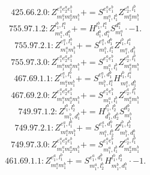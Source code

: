 \documentclass[letterpaper,10pt,fleqn,leqno,onecolumn]{article}
\begin{document}
\begin{equation} \;\;\;\;\;\;  425.66.2.0: Z^{e_{1}^{a}e_{2}^{a}e_{1}^{b}}_{m_{1}^{a}m_{2}^{a}m_{1}^{b}}+=S^{e_{1}^{a}e_{1}^{b}}_{m_{1}^{a},l_{1}^{b}}Z^{e_{2}^{a},l_{1}^{b}}_{m_{2}^{a}m_{1}^{b}} \end{equation}
\begin{equation} \;\;\;\;\;\;  755.97.1.2: Z^{l_{1}^{b},l_{1}^{a}}_{m_{1}^{a},d_{1}^{b}}+=H^{l_{1}^{b},l_{1}^{a}}_{d_{1}^{b},d_{1}^{a}}S^{d_{1}^{a}}_{m_{1}^{a}}\cdot -1. \end{equation}
\begin{equation} \;\;\;\;\;\;  755.97.2.1: Z^{e_{1}^{a},l_{1}^{b}}_{m_{1}^{a}m_{1}^{b}}+=S^{e_{1}^{a},d_{1}^{b}}_{m_{1}^{b},l_{1}^{a}}Z^{l_{1}^{b},l_{1}^{a}}_{m_{1}^{a},d_{1}^{b}} \end{equation}
\begin{equation} \;\;\;\;\;\;  755.97.3.0: Z^{e_{1}^{a}e_{2}^{a}e_{1}^{b}}_{m_{1}^{a}m_{2}^{a}m_{1}^{b}}+=S^{e_{1}^{a}e_{1}^{b}}_{m_{1}^{a},l_{1}^{b}}Z^{e_{2}^{a},l_{1}^{b}}_{m_{2}^{a}m_{1}^{b}} \end{equation}
\begin{equation} \;\;\;\;\;\;  467.69.1.1: Z^{e_{1}^{a},l_{1}^{b}}_{m_{1}^{a}m_{1}^{b}}+=S^{e_{1}^{a},d_{1}^{b}}_{m_{1}^{b},l_{1}^{a}}H^{l_{1}^{b},l_{1}^{a}}_{m_{1}^{a},d_{1}^{b}} \end{equation}
\begin{equation} \;\;\;\;\;\;  467.69.2.0: Z^{e_{1}^{a}e_{2}^{a}e_{1}^{b}}_{m_{1}^{a}m_{2}^{a}m_{1}^{b}}+=S^{e_{1}^{a}e_{1}^{b}}_{m_{1}^{a},l_{1}^{b}}Z^{e_{2}^{a},l_{1}^{b}}_{m_{2}^{a}m_{1}^{b}} \end{equation}
\begin{equation} \;\;\;\;\;\;  749.97.1.2: Z^{l_{1}^{b},l_{2}^{b}}_{m_{1}^{b},d_{1}^{b}}+=H^{l_{1}^{b},l_{2}^{b}}_{d_{1}^{b},d_{2}^{b}}S^{d_{2}^{b}}_{m_{1}^{b}} \end{equation}
\begin{equation} \;\;\;\;\;\;  749.97.2.1: Z^{e_{1}^{a},l_{1}^{b}}_{m_{1}^{a}m_{1}^{b}}+=S^{e_{1}^{a},d_{1}^{b}}_{m_{1}^{a},l_{2}^{b}}Z^{l_{1}^{b},l_{2}^{b}}_{m_{1}^{b},d_{1}^{b}} \end{equation}
\begin{equation} \;\;\;\;\;\;  749.97.3.0: Z^{e_{1}^{a}e_{2}^{a}e_{1}^{b}}_{m_{1}^{a}m_{2}^{a}m_{1}^{b}}+=S^{e_{1}^{a}e_{1}^{b}}_{m_{1}^{a},l_{1}^{b}}Z^{e_{2}^{a},l_{1}^{b}}_{m_{2}^{a}m_{1}^{b}} \end{equation}
\begin{equation} \;\;\;\;\;\;  461.69.1.1: Z^{e_{1}^{a},l_{1}^{b}}_{m_{1}^{a}m_{1}^{b}}+=S^{e_{1}^{a},d_{1}^{b}}_{m_{1}^{a},l_{2}^{b}}H^{l_{1}^{b},l_{2}^{b}}_{m_{1}^{b},d_{1}^{b}}\cdot -1. \end{equation}
\end{document}
